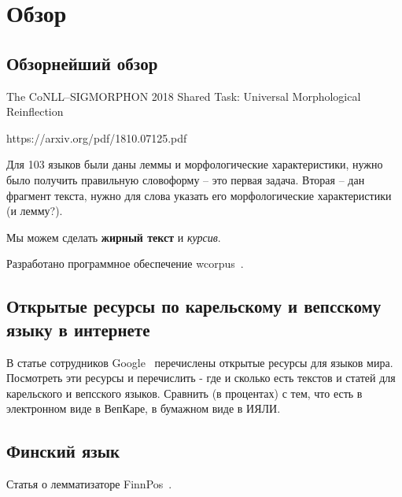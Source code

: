 \chapter{Обзор} \label{chapt1}

\section{Обзорнейший обзор} \label{sect1_1}

The CoNLL--SIGMORPHON 2018 Shared Task: Universal Morphological Reinflection

https://arxiv.org/pdf/1810.07125.pdf

Для 103 языков были даны леммы и морфологические характеристики, 
нужно было получить правильную словоформу -- это первая задача. 
Вторая -- дан фрагмент текста, нужно для слова указать его морфологические 
характеристики (и лемму?).

Мы можем сделать \textbf{жирный текст} и \textit{курсив}.

Разработано программное обеспечение wcorpus~\cite{vakbib_soft_wcorpus}.



\section{Открытые ресурсы по карельскому и вепсскому языку в интернете} \label{sect_open_krl_vep_inet}

В статье сотрудников Google~\cite{Prasad2018}  перечислены открытые ресурсы для языков мира. 
Посмотреть эти ресурсы и перечислить - где и сколько есть текстов и статей 
для карельского и вепсского языков. Сравнить (в процентах) с тем, что есть 
в электронном виде в ВепКаре, в бумажном виде в ИЯЛИ.




\section{Финский язык} \label{sect1_2}

Статья о лемматизаторе FinnPos~\cite{silfverberg2016finnpos}.


